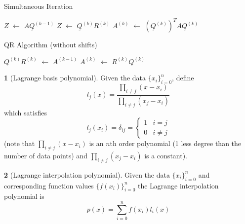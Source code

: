 \documentclass[12pt]{article}
\theoremstyle{definition}
\newtheorem{definition}{\color{NavyBlue}{\textbf{Definition}}}
\newcommand*\Let[2]{\State #1 $\gets$ #2}
\begin{document}
\begin{algorithm}[ht]
  \caption{Simultaneous Iteration}
  \begin{algorithmic}[1]
    \Let{$Z$}{$A \underline Q^{(k-1)}$} 
    \Let{$Z$}{$\underline Q^{(k)} R^{(k)}$} 
    \Let{$A^{(k)}$}{$(\underline Q^{(k)})^T A \underline Q^{(k)}$}  
    \EndFor
  \end{algorithmic}
\end{algorithm}

\begin{algorithm}[ht]
  \caption{QR Algorithm (without shifts)}
  \begin{algorithmic}[1]
    \Let{$Q^{(k)}R^{(k)}$}{$A^{(k-1)}$} 
    \Let{$A^{(k)}$}{$R^{(k)}Q^{(k)}$} 
    \EndFor
  \end{algorithmic}
\end{algorithm}

\begin{definition}[Lagrange basis polynomial]
Given the data $\{x_i\}_{i=0}^n$, define
\begin{equation}
l_j(x) = \frac{\prod_{i\neq j} (x-x_i)}{\prod_{i\neq j} (x_j-x_i)}
\end{equation}
which satisfies
\begin{equation}
l_j(x_i) = \delta_{ij} =
\begin{cases}
1 & i=j \\
0 & i\neq j
\end{cases}
\end{equation}
(note that $\prod_{i\neq j} (x-x_i)$ is an $n$th order polynomial (1 less degree than the number of data points) and $\prod_{i\neq j} (x_j-x_i)$ is a constant).
\end{definition}

\begin{definition}[Lagrange interpolation polynomial]
Given the data $\{x_i\}_{i=0}^n$ and corresponding function values $\{f(x_i)\}_{i=0}^n$ the Lagrange interpolation polynomial is
\begin{equation}
p(x) = \sum_{i=0}^n f(x_i) l_i(x)
\end{equation}
\end{definition}
\end{document}
